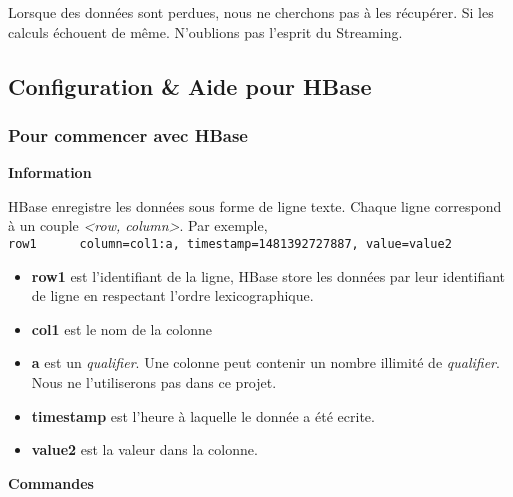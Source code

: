\documentclass[a4paper,oneside,12pt]{article}
\begin{document}
Lorsque des données sont perdues, nous ne cherchons pas à les récupérer. Si les calculs échouent de même. N'oublions pas l'esprit du Streaming. 

\pagebreak
\subsection{Configuration \& Aide pour HBase}


\subsubsection{Pour commencer avec HBase}

\textbf{Information}

HBase enregistre les données sous forme de ligne texte. Chaque ligne correspond à un couple \textit{<row, column>}. 
Par exemple, \\
\verb!row1      column=col1:a, timestamp=1481392727887, value=value2!

\begin{itemize}
\item \textbf{row1} est l'identifiant de la ligne, HBase store les données par leur identifiant de ligne en respectant l'ordre lexicographique. 
\item \textbf{col1} est le nom de la colonne
\item \textbf{a} est un \textit{qualifier}. Une colonne peut contenir un nombre illimité de \textit{qualifier}. Nous ne l'utiliserons pas dans ce projet. 
\item \textbf{timestamp} est l'heure à laquelle le donnée a été ecrite. 
\item \textbf{value2} est la valeur dans la colonne. 
\end{itemize}

\textbf{Commandes}
\end{document}
